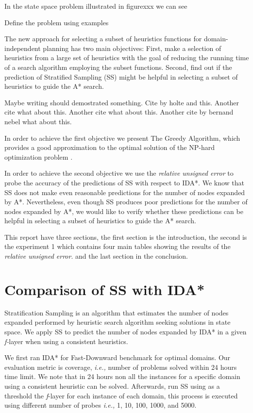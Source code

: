 \documentclass[a4paper,12pt]{article}
\begin{document}
In the state space problem illustrated in figurexxx we can see


Define the problem using examples


The new approach for selecting a subset of heuristics functions for domain-independent planning has two main objectives: First, make a selection of heuristics from a large set of heuristics with the goal of reducing the running time of a search algorithm employing the subset functions. Second, find out if the prediction of Stratified Sampling (SS) might be helpful in selecting a subset of heuristics to guide the A* search.

Maybe writing \citep{krause2012submodular} should demostrated something.
Cite by holte \citep{holte2006maximizing} and this.
Another cite \citep{xu2014solving} what about this.
Another cite \citep{krause2007near} what about this.
Another cite by bernand nebel \citep{backstrom1995complexity} what about this.


In order to achieve the first objective we present The Greedy Algorithm, which provides a good approximation to the optimal solution of the NP-hard optimization problem \citep{krause2012submodular}. 

In order to achieve the second objective we use the \textit{relative unsigned error} to probe the accuracy of the predictions of SS with respect to IDA*. We know that SS does not make even reasonable predictions for the number of nodes expanded by A*. Nevertheless, even though SS produces poor predictions for the number of nodes expanded by A*, we would like to verify whether these predictions can be helpful in selecting a subset of heuristics to guide the A* search.

This report have three sections, the first section is the introduction, the second is the experiment 1 which contains four main tables showing the results of the \textit{relative unsigned error}. and the last section in the conclusion.

\section{Comparison of SS with IDA*}
Stratification Sampling is an algorithm that estimates the number of nodes expanded performed by heuristic search algorithm seeking solutions in state space. We apply SS to predict the number of nodes expanded by IDA* in a given \textit{f-}layer when using a consistent heuristics.

We first ran IDA* for Fast-Downward benchmark for optimal domains. Our evaluation metric is coverage, \textit{i.e.,} number of problems solved within 24 hours time limit. We note that in 24 hours non all the instances for a specific domain using a consistent heuristic can be solved. Afterwards, run SS using as a threshold the \textit{f}-layer for each instance of each domain, this process is executed using different number of probes \textit{i.e.,} 1, 10, 100, 1000, and 5000. 
\end{document}
